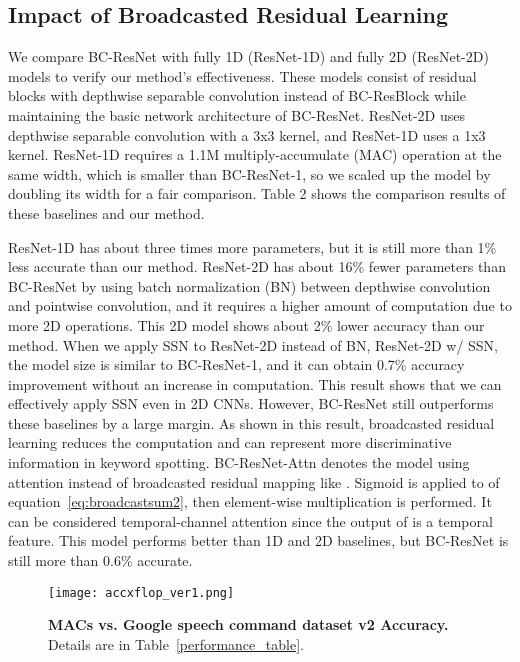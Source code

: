 \documentclass[a4paper]{article}
\begin{document}
\subsection{Impact of Broadcasted Residual Learning}
We compare BC-ResNet with fully 1D (ResNet-1D) and fully 2D (ResNet-2D) models to verify our method's effectiveness. These models consist of residual blocks with depthwise separable convolution instead of BC-ResBlock while maintaining the basic network architecture of BC-ResNet. ResNet-2D uses depthwise separable convolution with a 3x3 kernel, and ResNet-1D uses a 1x3 kernel. ResNet-1D requires a 1.1M multiply-accumulate (MAC) operation at the same width, which is smaller than BC-ResNet-1, so we scaled up the model by doubling its width for a fair comparison. Table 2 shows the comparison results of these baselines and our method.  

ResNet-1D has about three times more parameters, but it is still more than 1\% less accurate than our method. ResNet-2D has about 16\% fewer parameters than BC-ResNet by using batch normalization (BN) between depthwise convolution and pointwise convolution, and it requires a higher amount of computation due to more 2D operations. This 2D model shows about 2\% lower accuracy than our method. When we apply SSN to ResNet-2D instead of BN, ResNet-2D w/ SSN, the model size is similar to BC-ResNet-1, and it can obtain 0.7\% accuracy improvement without an increase in computation. This result shows that we can effectively apply SSN even in 2D CNNs. However, BC-ResNet still outperforms these baselines by a large margin. As shown in this result, broadcasted residual learning reduces the computation and can represent more discriminative information in keyword spotting.
BC-ResNet-Attn denotes the model using attention instead of broadcasted residual mapping like \cite{hu2018squeeze, lee2020urnet}. Sigmoid is applied to  of equation~\ref{eq:broadcastsum2}, then element-wise multiplication is performed. It can be considered temporal-channel attention since the output of  is a temporal feature. This model performs better than 1D and 2D baselines, but BC-ResNet is still more than 0.6\% accurate.

\begin{figure}[t]
  \centering
  \texttt{[image: accxflop\_ver1.png]}
  \vskip -0.05in
  \caption{\textbf{MACs vs. Google speech command dataset v2 Accuracy.}  Details are in Table~\ref{performance_table}.}
  \label{accxflop}
\end{figure}
\end{document}

